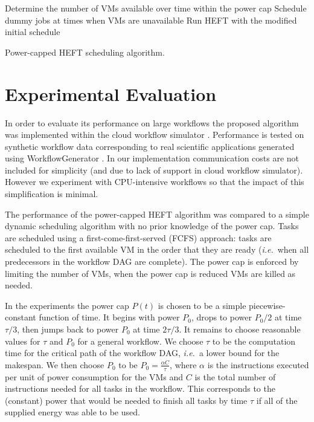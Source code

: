 \documentclass[10pt, conference, compsocconf]{IEEEtran} %
\newcommand{\ie}{\textit{i.e.}\ }
\begin{document}
\begin{algorithm}
  \begin{algorithmic}[1]
    \State Determine the number of VMs available over time within the power cap
    \State Schedule dummy jobs at times when VMs are unavailable
    \State Run HEFT with the modified initial schedule


  \end{algorithmic}
  \caption{Power-capped HEFT scheduling algorithm.}
  \label{alg:power-capped-heft}
\end{algorithm}

\section{Experimental Evaluation}

In order to evaluate its performance on large workflows the proposed algorithm was implemented within the cloud workflow simulator \cite{CloudWorkflowSimulator,malawski2012cost}.
Performance is tested on synthetic workflow data corresponding to real scientific applications generated using WorkflowGenerator \cite{WorkflowGenerator,Silva2014WorkflowGenerator}.
In our implementation communication costs are not included for simplicity (and due to lack of support in cloud workflow simulator).
However we experiment with CPU-intensive workflows \cite{Bharathi2008} so that the impact of this simplification is minimal.

The performance of the power-capped HEFT algorithm was compared to a simple dynamic scheduling algorithm with no prior knowledge of the power cap.
Tasks are scheduled using a first-come-first-served (FCFS) approach: tasks are scheduled to the first available VM in the order that they are ready (\ie when all predecessors in the workflow DAG are complete).
The power cap is enforced by limiting the number of VMs, when the power cap is reduced VMs are killed as needed.

In the experiments the power cap $P(t)$ is chosen to be a simple piecewise-constant function of time.
It begins with power $P_0$, drops to power $P_0/2$ at time $\tau/3$, then jumps back to power $P_0$ at time $2\tau/3$.
It remains to choose reasonable values for $\tau$ and $P_0$ for a general workflow.
We choose $\tau$ to be the computation time for the critical path of the workflow DAG, \ie a lower bound for the makespan.
We then choose $P_0$ to be $P_0 = \frac{\alpha C}{\tau}$, where $\alpha$ is the instructions executed per unit of power consumption for the VMs and $C$ is the total number of instructions needed for all tasks in the workflow.
This corresponds to the (constant) power that would be needed to finish all tasks by time $\tau$ if all of the supplied energy was able to be used.
\end{document}
